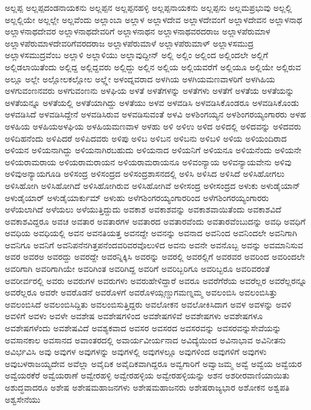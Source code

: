 {ಅಲ್ಲಪ್ಪ
ಅಲ್ಲಪ್ಪದಂಡನಾಯಕನು
ಅಲ್ಲಪ್ಪನ
ಅಲ್ಲಪ್ಪನಹಳ್ಳಿ
ಅಲ್ಲಪ್ಪನಾಯಕನು
ಅಲ್ಲಪ್ಪನು
ಅಲ್ಲಮಪ್ರಭುವು
ಅಲ್ಲಲ್ಲಿ
ಅಲ್ಲಲ್ಲಿಯೇ
ಅಲ್ಲಲ್ಲೇ
ಅಲ್ಲವೆಂದು
ಅಲ್ಲಾಂಬಾ
ಅಲ್ಲಾಳ
ಅಲ್ಲಾಳದೇವ
ಅಲ್ಲಾಳದೇವಂಗೆ
ಅಲ್ಲಾಳದೇವನ
ಅಲ್ಲಾಳನಾಥ
ಅಲ್ಲಾಳನಾಥದೇವರ
ಅಲ್ಲಾಳನಾಥದೇವರಿಗೆ
ಅಲ್ಲಾಳನಾಥನ
ಅಲ್ಲಾಳನಾಥವರದರಾಜ
ಅಲ್ಲಾಳಪೆರುಮಾಳ
ಅಲ್ಲಾಳಪೆರುಮಾಳದೇವರಿಗೆವರದರಾಜ
ಅಲ್ಲಾಳಪೆರುಮಾಳೆ
ಅಲ್ಲಾಳಪೆರುಮಾಳ್
ಅಲ್ಲಾಳಸಮುದ್ರ
ಅಲ್ಲಾಳಸಮುದ್ರವೆಂಬ
ಅಲ್ಲಾಳಿ
ಅಲ್ಲಾಳಿಯು
ಅಲ್ಲಾವುದ್ದೀನ್
ಅಲ್ಲಿ
ಅಲ್ಲಿಂ
ಅಲ್ಲಿಂದ
ಅಲ್ಲಿಂದಲೇ
ಅಲ್ಲಿಗೆ
ಅಲ್ಲಿಡಲಾಯಿತೆಂದು
ಅಲ್ಲಿದ್ದ
ಅಲ್ಲಿದ್ದವರು
ಅಲ್ಲಿದ್ದು
ಅಲ್ಲಿನ
ಅಲ್ಲಿಯ
ಅಲ್ಲಿಯವರೆಗೆ
ಅಲ್ಲಿಯೂ
ಅಲ್ಲಿಯೇ
ಅಲ್ಲಿರುವ
ಅಲ್ಲೂ
ಅಲ್ಲೇ
ಅಲ್ಲೋಲಕಲ್ಲೋಲ
ಅಲ್ಲ್ಲೇ
ಅಳಂದ್ನವರಾದ
ಅಳಗಿಯ
ಅಳಗಿಯಮಣವಾಳರಿಗೆ
ಅಳಗಿಹಿಯ
ಅಳಗುವಂಣನವರು
ಅಳಗುವಂಣನು
ಅಳಘಿಯ
ಅಳತೆ
ಅಳತೆಗಳನ್ನು
ಅಳತೆಗಳು
ಅಳತೆಗೆ
ಅಳತೆಯ
ಅಳತೆಯನ್ನು
ಅಳತೆಯನ್ನೂ
ಅಳತೆಯಲ್ಲಿ
ಅಳತೆಯಾಗಿದ್ದು
ಅಳತೆಯು
ಅಳವ
ಅಳವಡಿಸಿ
ಅಳವಡಿಸಿಕೊಂಡರೂ
ಅಳವಡಿಸಿಕೊಂಡು
ಅಳವಡಿಸಿದೆ
ಅಳವಡಿಸಿದ್ದೇನೆ
ಅಳವಡಿಸಿರುವ
ಅಳವಡಿಸುವಂತೆ
ಅಳವಿ
ಅಳಶಿಂಗಯ್ಯನ
ಅಳಶಿಂಗರಯ್ಯಂಗಾರರು
ಅಳಹ
ಅಳಹಿಯ
ಅಳಹಿಯಅಳಘಿಯ
ಅಳಹಿಯಮಣವಾಳ
ಅಳಹು
ಅಳಿ
ಅಳಿಉ
ಅಳಿದ
ಅಳಿದಲ್ಲಿ
ಅಳಿದವನ್ನು
ಅಳಿದವರು
ಅಳಿದಿಹನೆಂದು
ಅಳಿಪಿದರೆ
ಅಳಿಪಿದವರು
ಅಳಿಪು
ಅಳಿಬ
ಅಳಿಬನ
ಅಳಿಬನು
ಅಳಿಬಳಿ
ಅಳಿಯ
ಅಳಿಯಂದಿರಾದ
ಅಳಿಯನ
ಅಳಿಯನಾಗಿದ್ದು
ಅಳಿಯನಾಗಿರಬಹುದು
ಅಳಿಯನಾದ
ಅಳಿಯನಿಗೆ
ಅಳಿಯನೂ
ಅಳಿಯನೆಂದು
ಅಳಿಯನೇ
ಅಳಿಯರಾಮರಾಯ
ಅಳಿಯರಾಮರಾಯನ
ಅಳಿಯರಾಮರಾಯನೂ
ಅಳಿವಂನ್ಯಾಯ
ಅಳಿವನ್ಯಾಯವೇನು
ಅಳಿವು
ಅಳಿವುಅನ್ಯಾಯಗೂಡಿ
ಅಳಿಸಂದ್ರ
ಅಳಿಸಂದ್ರದ
ಅಳಿಸಂದ್ರಶಾಸನದಲ್ಲಿ
ಅಳಿಸಿ
ಅಳಿಸಿದ
ಅಳಿಸಿದೆ
ಅಳಿಸಿಹೋಗಲು
ಅಳಿಸಿಹೋಗಿ
ಅಳಿಸಿಹೋಗಿದೆ
ಅಳಿಸಿಹೋಗಿರುವ
ಅಳಿಸಿಹೋಗಿವೆ
ಅಳೀಸಂದ್ರ
ಅಳೀಸಂದ್ರದ
ಅಳುಕು
ಅಳುಡೈಯಾನ್
ಅಳುಡೈಯಾರ್
ಅಳುಡೈಯಾರ್ಕುಮ್
ಅಳುಹು
ಅಳೆಗಶಿಂಗರಯ್ಯಂಗಾರರಿಂದ
ಅಳೆಗಶಿಂಗರಯ್ಯಂಗಾರರು
ಅಳೆಯಲಾಗಿದೆ
ಅಳೆಯಲು
ಅಳೆಯುತ್ತಿದ್ದುದು
ಅವಕಾಶ
ಅವಕಾಶವನ್ನು
ಅವಕಾಶವಾಯಿತೆಂದು
ಅವಕಾಶವಿದೆ
ಅವಕಾಶವಿದ್ದರೂ
ಅವಚ
ಅವತಾರ
ಅವತಾರಗಳ
ಅವತಾರದ
ಅವತಾರವೆಂದು
ಅವತಾರವೆಂಬುದನ್ನು
ಅವಧಿ
ಅವಧಿಗೆ
ಅವಧಿಯ
ಅವಧಿಯಲ್ಲಿ
ಅವನ
ಅವನತಿಯತ್ತ
ಅವನದ್ದೇ
ಅವನನ್ನು
ಅವನಾದ
ಅವನಿಂದ
ಅವನಿಂದಲೇ
ಅವನಿಗಾಗಿ
ಅವನಿಗೂ
ಅವನಿಗೆ
ಅವನಿಪನೆನಗಿತ್ತಪನೆಂದವರಿವರವೊಲುಳಿದ
ಅವನು
ಅವನೇ
ಅವನೊಬ್ಬ
ಅವನ್ನು
ಅವಮಾನಿಸುವ
ಅವರ
ಅವರಅ
ಅವರದ್ದು
ಅವರದ್ದೇ
ಅವರನ್ನಿಕ್ಕಿಸಿ
ಅವರನ್ನು
ಅವರಲ್ಲಿ
ಅವರಲ್ಲಿಗೆ
ಅವರವರ
ಅವರಿಂದ
ಅವರಿಂದಲೇ
ಅವರಿಗಾಗಿ
ಅವರಿಗಾಗಿಯೇ
ಅವರಿಗಿಂತ
ಅವರಿಗಿದ್ದ
ಅವರಿಗೆ
ಅವರಿಬ್ಬರಿಗೂ
ಅವರಿಬ್ಬರೂ
ಅವರಿವರಂತೆ
ಅವರೀರ್ವರಲ್ಲಿ
ಅವರು
ಅವರುಗಳ
ಅವರುಗಳು
ಅವರುಹೇಳಿದ್ದಾರೆ
ಅವರೂ
ಅವರೆಗೆರೆಯ
ಅವರೆಲ್ಲರ
ಅವರೆಲ್ಲರನ್ನೂ
ಅವರೆಲ್ಲರೂ
ಅವರೇ
ಅವರೊಡನೆ
ಅವರೊಳಗೆ
ಅವರೊಳಯ್ಗಣ್ಡುಗಮಣ್ನಮ್ಮ
ಅವಲಂಬಿಸಿ
ಅವಲಂಬಿಸಿತ್ತು
ಅವಲಂಬಿಸಿದೆ
ಅವಲಂಬಿಸಿದ್ದಿತು
ಅವಲಂಬಿಸುತ್ತಿದ್ದರು
ಅವಲೋಕನ
ಅವಲೋಕಿಸಿದಾಗ
ಅವಳ
ಅವಳನ್ನು
ಅವಳಿ
ಅವಳಿಗೆ
ಅವಳು
ಅವಳೇ
ಅವಶೇಷ
ಅವಶೇಷಗಳಿಂದ
ಅವಶೇಷಗಳಿವೆ
ಅವಶೇಷಗಳು
ಅವಶೇಷಗಳೂ
ಅವಶೇಷಗಳೆಂದು
ಅವಶೇಷವಿದೆ
ಅವಶ್ಯಕವಾದ
ಅವಸರ
ಅವಸರದ
ಅವಸರವನ್ನು
ಅವಸರವನ್ನುಸೇವೆಯನ್ನು
ಅವಸಾನಕಾಲ
ಅವಸಾನದ
ಅವಾಂತರದಲ್ಲಿ
ಅವಾರ್ಯವೀರ್ಯನಾದ
ಅವಿದ್ಯೆಯಿಂದ
ಅವಿನಾಭಾವ
ಅವಿನೀತನು
ಅವಿರ್ಭವಿಸಿ
ಅವು
ಅವುಗಳ
ಅವುಗಳನ್ನು
ಅವುಗಳಲ್ಲಿ
ಅವುಗಳಲ್ಲೂ
ಅವುಗಳಿಂದ
ಅವುಗಳಿಗೆ
ಅವುಗಳು
ಅವುಬಳರಾಜಯ್ಯದೇವ
ಅವೆಲ್ಲಾ
ಅವೈದಿಕ
ಅವೈದಿಕವಾಗಿದ್ದರೂ
ಅವ್ವಗಾರಿಗೆ
ಅವ್ವಾಜಮ್ಮ
ಅವ್ವೆ
ಅವ್ವೆಯ
ಅವ್ವೆಯರ
ಅವ್ವೆಯರಕೆರೆ
ಅವ್ವೆಯರಾಣೆ
ಅವ್ವೇರಹಳ್ಳಿ
ಅವ್ವೇರಹಳ್ಳಿಯ
ಅವ್ವೇರಹಳ್ಳಿಯನ್ನು
ಅಶನ
ಅಶರೀರವಾಣಿಯಾಯಿತು
ಅಶುದ್ಧವಾದರೂ
ಅಶೇಷ
ಅಶೇಷಮಹಾಜನಗಳು
ಅಶೇಷಮಹಾಜನರು
ಅಶೇಷರಾಜ್ಯಭಾರ
ಅಶೋಕನ
ಅಶ್ವಪತಿ
ಅಶ್ವಸೇನೆಯು
}
